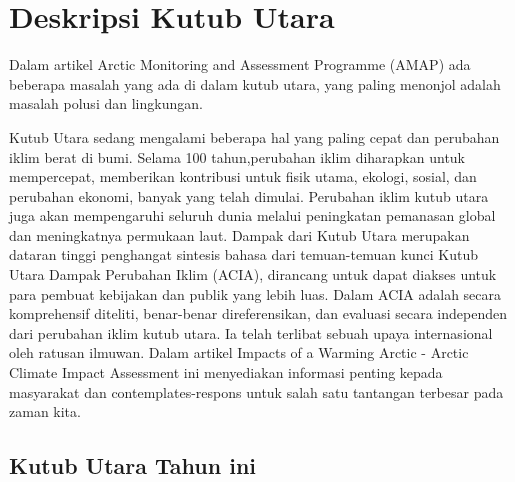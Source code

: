 %

\section{Deskripsi Kutub Utara}	

		Dalam artikel Arctic Monitoring and Assessment Programme (AMAP)  ada beberapa masalah yang ada di dalam 
	kutub utara, yang paling menonjol adalah masalah polusi dan lingkungan.
		
		Kutub Utara sedang mengalami beberapa hal yang paling cepat dan perubahan iklim berat di bumi. Selama 100 tahun,perubahan
	iklim diharapkan untuk mempercepat, memberikan kontribusi untuk fisik utama, ekologi, sosial, dan perubahan ekonomi, banyak yang 
	telah dimulai. Perubahan iklim kutub utara juga akan mempengaruhi seluruh dunia melalui peningkatan pemanasan global dan meningkatnya permukaan laut. 
	Dampak dari Kutub Utara merupakan dataran tinggi penghangat sintesis bahasa dari temuan-temuan kunci Kutub Utara Dampak Perubahan Iklim (ACIA), dirancang 
	untuk dapat diakses untuk para pembuat kebijakan dan publik yang lebih luas. Dalam ACIA adalah secara komprehensif diteliti, benar-benar direferensikan,
	dan evaluasi secara independen dari perubahan iklim kutub utara. Ia telah terlibat sebuah upaya internasional oleh ratusan ilmuwan.
	Dalam artikel Impacts of a Warming Arctic - Arctic Climate Impact Assessment ini menyediakan informasi penting kepada masyarakat dan contemplates-respons 
	untuk salah satu tantangan terbesar pada zaman kita.
	
\subsection{Kutub Utara Tahun ini}

